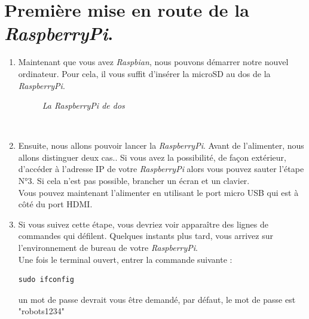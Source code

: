 \section{Première mise en route de la \textit{RaspberryPi}.}

\begin{enumerate}

	\item Maintenant que vous avez \textit{Raspbian}, nous pouvons démarrer notre nouvel ordinateur.
Pour cela, il vous suffit d'insérer la microSD au dos de la \textit{RaspberryPi}.\\
\begin{figure}[H]
\begin{center}
\end{center}
	\caption{ \textit{La \textit{RaspberryPi} de dos}}
\end{figure}\\

	\item Ensuite, nous allons pouvoir lancer la \textit{RaspberryPi}. Avant de l'alimenter, nous allons distinguer deux cas.. Si vous avez la possibilité, de façon extérieur, d'accéder à l'adresse IP de votre \textit{RaspberryPi} alors vous pouvez sauter l'étape N°3. Si cela n'est pas possible, brancher un écran et un clavier.\\
	Vous pouvez maintenant l'alimenter en utilisant le port micro USB qui est à côté du port HDMI.\\
	
	\item Si vous suivez cette étape, vous devriez voir apparaître des lignes de commandes qui défilent. Quelques instants plus tard, vous arrivez sur l'environnement de bureau de votre \textit{RaspberryPi}.\\
Une fois le terminal ouvert, entrer la commande suivante :\\
\begin{lstlisting}[style=MyBashStyle]
	sudo ifconfig
\end{lstlisting}
un mot de passe devrait vous être demandé, par défaut, le mot de passe est "robots1234"


\end{enumerate}
